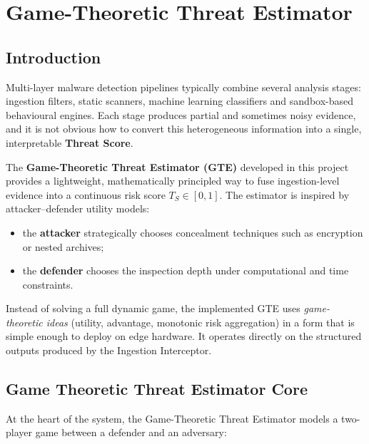 \documentclass[12pt, a4paper]{report}
\begin{document}
\cleardoublepage



\chapter{Game-Theoretic Threat Estimator}
\label{chap:gte}

\section{Introduction}

Multi-layer malware detection pipelines typically combine several analysis
stages: ingestion filters, static scanners, machine learning classifiers and
sandbox-based behavioural engines. Each stage produces partial and sometimes
noisy evidence, and it is not obvious how to convert this heterogeneous
information into a single, interpretable \textbf{Threat Score}.

The \textbf{Game-Theoretic Threat Estimator (GTE)} developed in this project
provides a lightweight, mathematically principled way to fuse ingestion-level
evidence into a continuous risk score $T_S \in [0,1]$. The estimator is
inspired by attacker--defender utility models:

\begin{itemize}
    \item the \textbf{attacker} strategically chooses concealment techniques
          such as encryption or nested archives;
    \item the \textbf{defender} chooses the inspection depth under
          computational and time constraints.
\end{itemize}

Instead of solving a full dynamic game, the implemented GTE uses
\emph{game-theoretic ideas} (utility, advantage, monotonic risk aggregation)
in a form that is simple enough to deploy on edge hardware. It operates
directly on the structured outputs produced by the Ingestion Interceptor.


\section{Game Theoretic Threat Estimator Core}

At the heart of the system, the Game-Theoretic Threat Estimator models a
two-player game between a defender and an adversary:
\end{document}
